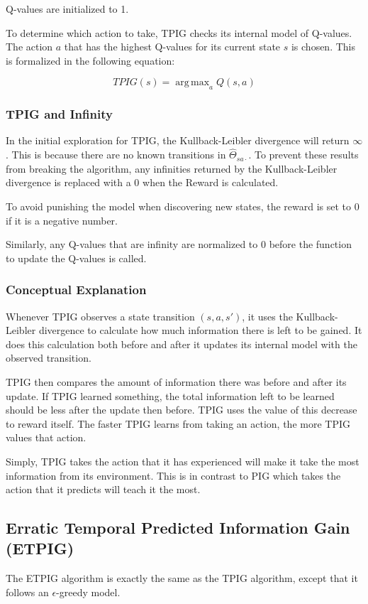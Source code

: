\documentclass[12pt]{thesis}
\DeclareMathOperator*{\argmax}{arg\,max}
\begin{document}
Q-values are initialized to 1.

To determine which action to take, TPIG checks its internal model of Q-values. The action $a$ that has the highest Q-values for its current state $s$ is chosen. This is formalized in the following equation:

\[ TPIG(s) = \argmax_a  Q(s,a)\]

\subsubsection{TPIG and Infinity}
In the initial exploration for TPIG, the Kullback-Leibler divergence will return $\infty$. This is because there are no known transitions in $\hat{\Theta}_{sa\cdot}$. To prevent these results from breaking the algorithm, any infinities returned by the Kullback-Leibler divergence is replaced with a 0 when the Reward is calculated.

To avoid punishing the model when discovering new states, the reward is set to 0 if it is a negative number.

Similarly, any Q-values that are infinity are normalized to 0 before the function to update the Q-values is called.

\subsubsection{Conceptual Explanation}
Whenever TPIG observes a state transition $(s,a,s')$, it uses the Kullback-Leibler divergence to calculate how much information there is left to be gained. It does this calculation both before and after it updates its internal model with the observed transition.

TPIG then compares the amount of information there was before and after its update. If TPIG learned something, the total information left to be learned should be less after the update then before. TPIG uses the value of this decrease to reward itself. The faster TPIG learns from taking an action, the more TPIG values that action.

Simply, TPIG takes the action that it has experienced will make it take the most information from its environment. This is in contrast to PIG which takes the action that it predicts will teach it the most.

\subsection{Erratic Temporal Predicted Information Gain (ETPIG)}
The ETPIG algorithm is exactly the same as the TPIG algorithm, except that it follows an $\epsilon$-greedy model.
\end{document}
